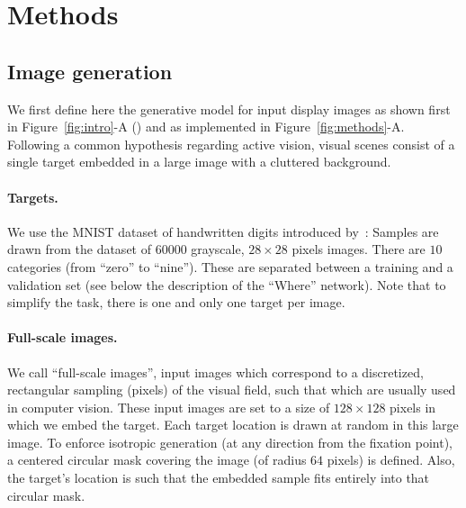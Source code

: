 \section{Methods}
\label{sec:implementation}

\subsection{Image generation}
We first define here the generative model for input display images as shown first in Figure~\ref{fig:intro}-A (\DIS ) and as implemented in Figure~\ref{fig:methods}-A. Following a common hypothesis regarding active vision, visual scenes consist of a single target embedded in a large image with a cluttered background.

\paragraph{Targets.}
We use the MNIST dataset of handwritten digits introduced by~\cite{Lecun1998}: Samples are drawn from the dataset of $60000$ grayscale, $28\times 28$ pixels images. There are $10$ categories (from ``zero'' to ``nine''). These are separated between a training and a validation set (see below the description of the ``Where'' network). Note that to simplify the task, there is one and only one target per image.

\paragraph{Full-scale images.}
We call ``full-scale images'', input images which correspond to a discretized, rectangular sampling (pixels) of the visual field, such that which are usually used in computer vision. These input images are set to a size of $128\times 128$ pixels in which we embed the target. Each target location is drawn at random in this large image. To enforce isotropic generation (at any direction from the fixation point), a centered circular mask covering the image (of radius $64$ pixels) is defined. Also, the target's location is such that the embedded sample fits entirely into that circular mask.

